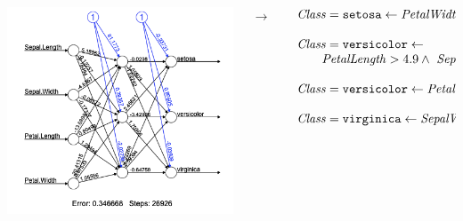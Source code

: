 \documentclass[presentation]{beamer}\mode<presentation>{\usetheme{blackAMSBolognaFC}}
\begin{document}
\begin{frame}[allowframebreaks]
\begin{itemize}
        \vfill
    \end{itemize}

    \framebreak
    \centering
    \begin{columns}
        \begin{column}{.4\linewidth}
            \includegraphics[width=\linewidth]{figures/extraction-iris}
        \end{column}
        \alert{$\rightarrow$}
        \begin{column}{.55\linewidth}\scriptsize
            \[ 
            \begin{array}{l}
                \variable{Class} = \functor{setosa} \leftarrow \variable{PetalWidth} \leq 1.0 \fullstop
                \\
                \\
                \variable{Class} = \functor{versicolor} \leftarrow \\
                \qquad \variable{PetalLength} > 4.9 \wedge\ \variable{SepalWidth} \in [2.9,\ 3.2] \fullstop
                \\
                \\
                \variable{Class} = \functor{versicolor} \leftarrow  \variable{PetalWidth} > 1.6 \fullstop
                \\
                \\
                \variable{Class} = \functor{virginica} \leftarrow \variable{SepalWidth} \leq 2.9 \fullstop

\end{array}\]
\end{column}
\end{columns}
\end{frame}
\end{document}
